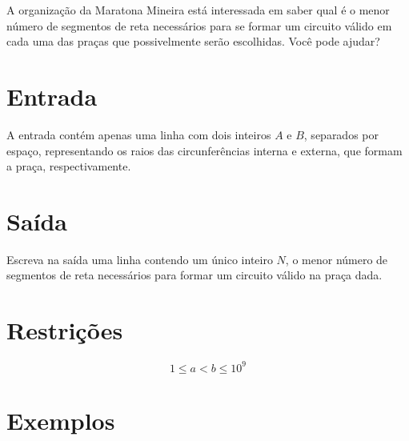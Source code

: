 A organização da Maratona Mineira está interessada em saber qual é o menor número de segmentos de reta necessários para se formar um circuito
válido em cada uma das praças que possivelmente serão escolhidas. Você pode ajudar?

\section*{Entrada}

A entrada contém apenas uma linha com dois inteiros $A$ e $B$, separados por espaço, representando os raios das circunferências interna e externa,
que formam a praça, respectivamente.

\section*{Saída}

Escreva na saída uma linha contendo um único inteiro $N$, o menor número de segmentos de reta necessários para formar um circuito válido na praça
dada.

\section*{Restrições}

$$1 \leq a < b \leq 10^9$$

\section*{Exemplos}
\exemplo
